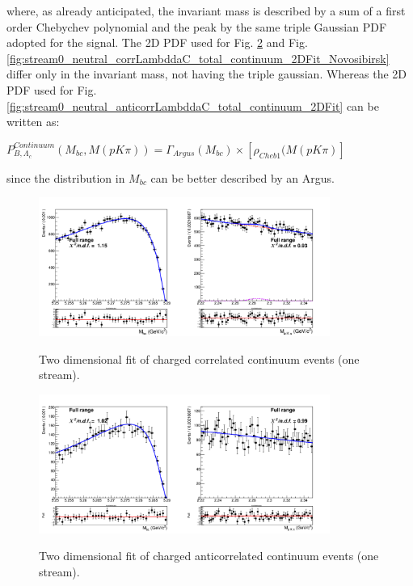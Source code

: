 where, as already anticipated, the invariant mass is described by a sum of a first order Chebychev polynomial and the peak by the same triple Gaussian PDF adopted for the signal. The  2D PDF used for Fig. \ref{fig:stream0_anticorrLambddaC_total_continuum_2DFit_Novosibirsk} and Fig. \ref{fig:stream0_neutral_corrLambddaC_total_continuum_2DFit_Novosibirsk} differ only in the invariant mass, not having the triple gaussian. Whereas the 2D PDF used for Fig. \ref{fig:stream0_neutral_anticorrLambddaC_total_continuum_2DFit} can be written as: \\
 \vspace{0.2 cm}

$P^{Continuum}_{B,\Lambda_c}(M_{bc}, M(p K \pi)) = \Gamma_{Argus}(M_{bc}) \times [\rho_{Cheb1}(M(p K \pi) ]$\\
\vspace{0.2 cm}

since the distribution in $M_{bc}$ can be better described by an Argus.
\begin{figure}
{\includegraphics[width=0.85\textwidth]{04-SimultaneousFit/figs/stream3corrLambddaC_total_continuum_2DFit.png}}
\caption{Two dimensional fit of charged correlated  continuum events (one stream).}
\label{fig:stream3corrLambddaC_total_continuum_2DFit}
\end{figure}


\begin{figure}
{\includegraphics[width=0.85\textwidth]{04-SimultaneousFit/figs/stream0_anticorrLambddaC_total_continuum_2DFit_Novosibirsk.png}}
\caption{Two dimensional fit of charged anticorrelated continuum events (one stream).}
\label{fig:stream0_anticorrLambddaC_total_continuum_2DFit_Novosibirsk}
\end{figure}

